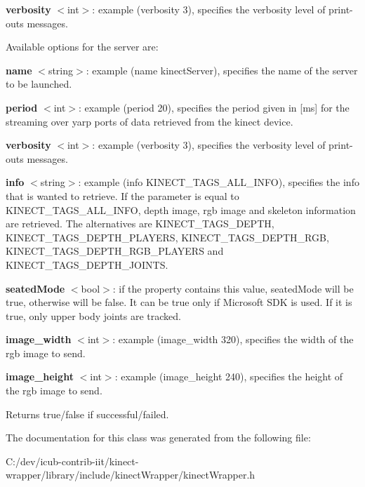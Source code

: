 {\bfseries verbosity} $<$int$>$\+: example (verbosity 3), specifies the verbosity level of print-\/outs messages.

Available options for the server are\+:

{\bfseries name} $<$string$>$\+: example (name kinect\+Server), specifies the name of the server to be launched.

{\bfseries period} $<$int$>$\+: example (period 20), specifies the period given in \mbox{[}ms\mbox{]} for the streaming over yarp ports of data retrieved from the kinect device.

{\bfseries verbosity} $<$int$>$\+: example (verbosity 3), specifies the verbosity level of print-\/outs messages.

{\bfseries info} $<$string$>$\+: example (info K\+I\+N\+E\+C\+T\+\_\+\+T\+A\+G\+S\+\_\+\+A\+L\+L\+\_\+\+I\+N\+F\+O), specifies the info that is wanted to retrieve. If the parameter is equal to K\+I\+N\+E\+C\+T\+\_\+\+T\+A\+G\+S\+\_\+\+A\+L\+L\+\_\+\+I\+N\+F\+O, depth image, rgb image and skeleton information are retrieved. The alternatives are K\+I\+N\+E\+C\+T\+\_\+\+T\+A\+G\+S\+\_\+\+D\+E\+P\+T\+H, K\+I\+N\+E\+C\+T\+\_\+\+T\+A\+G\+S\+\_\+\+D\+E\+P\+T\+H\+\_\+\+P\+L\+A\+Y\+E\+R\+S, K\+I\+N\+E\+C\+T\+\_\+\+T\+A\+G\+S\+\_\+\+D\+E\+P\+T\+H\+\_\+\+R\+G\+B, K\+I\+N\+E\+C\+T\+\_\+\+T\+A\+G\+S\+\_\+\+D\+E\+P\+T\+H\+\_\+\+R\+G\+B\+\_\+\+P\+L\+A\+Y\+E\+R\+S and K\+I\+N\+E\+C\+T\+\_\+\+T\+A\+G\+S\+\_\+\+D\+E\+P\+T\+H\+\_\+\+J\+O\+I\+N\+T\+S.

{\bfseries seated\+Mode} $<$bool$>$\+: if the property contains this value, seated\+Mode will be true, otherwise will be false. It can be true only if Microsoft S\+D\+K is used. If it is true, only upper body joints are tracked.

{\bfseries image\+\_\+width} $<$int$>$\+: example (image\+\_\+width 320), specifies the width of the rgb image to send.

{\bfseries image\+\_\+height} $<$int$>$\+: example (image\+\_\+height 240), specifies the height of the rgb image to send.

\begin{DoxyReturn}{Returns}
true/false if successful/failed. 
\end{DoxyReturn}


The documentation for this class was generated from the following file\+:\begin{DoxyCompactItemize}
\item 
C\+:/dev/icub-\/contrib-\/iit/kinect-\/wrapper/library/include/kinect\+Wrapper/kinect\+Wrapper.\+h\end{DoxyCompactItemize}
